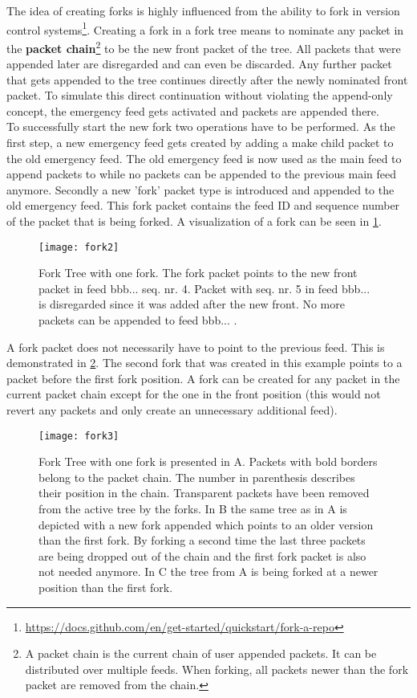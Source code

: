 The idea of creating forks is highly influenced from the ability to fork in version control systems\footnote{\url{https://docs.github.com/en/get-started/quickstart/fork-a-repo}}. Creating a fork in a fork tree means to nominate any packet in the \textbf{packet chain}\footnote{A packet chain is the current chain of user appended packets. It can be distributed over multiple feeds. When forking, all packets newer than the fork packet are removed from the chain.} to be the new front packet of the tree. All packets that were appended later are disregarded and can even be discarded. Any further packet that gets appended to the tree continues directly after the newly nominated front packet. To simulate this direct continuation without violating the append-only concept, the emergency feed gets activated and packets are appended there. \\
To successfully start the new fork two operations have to be performed. As the first step, a new emergency feed gets created by adding a make child packet to the old emergency feed. The old emergency feed is now used as the main feed to append packets to while no packets can be appended to the previous main feed anymore. Secondly a new 'fork' packet type is introduced and appended to the old emergency feed. This fork packet contains the feed ID and sequence number of the packet that is being forked. A visualization of a fork can be seen in \cref{fig:fork2}.

\begin{figure}
\centering
\texttt{[image: fork2]}
\caption{Fork Tree with one fork. The fork packet points to the new front packet in feed bbb... seq. nr. 4. Packet with seq. nr. 5 in feed bbb... is disregarded since it was added after the new front. No more packets can be appended to feed bbb... .}
\label{fig:fork2}
\end{figure}

A fork packet does not necessarily have to point to the previous feed. This is demonstrated in \cref{fig:fork3}. The second fork that was created in this example points to a packet before the first fork position. A fork can be created for any packet in the current packet chain except for the one in the front position (this would not revert any packets and only create an unnecessary additional feed).

\begin{figure}
\centering
\texttt{[image: fork3]}
\caption{Fork Tree with one fork is presented in A. Packets with bold borders belong to the packet chain. The number in parenthesis describes their position in the chain. Transparent packets have been removed from the active tree by the forks. In B the same tree as in A is depicted with a new fork appended which points to an older version than the first fork. By forking a second time the last three packets are being dropped out of the chain and the first fork packet is also not needed anymore. In C the tree from A is being forked at a newer position than the first fork.}
\label{fig:fork3}
\end{figure}


